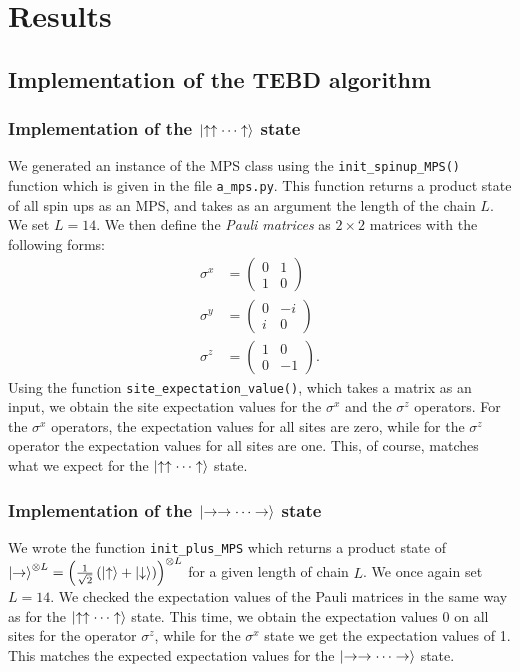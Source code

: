 \section{Results}
\subsection{Implementation of the TEBD algorithm}

\subsubsection{Implementation of the $\ket{\uparrow\uparrow\cdots\uparrow}$ state}
We generated an instance of the MPS class using the \texttt{init\_spinup\_MPS()} function which is given in the file \texttt{a\_mps.py}. This function returns a product state of all spin ups as an MPS, and takes as an argument the length of the chain $L$. We set $L = 14$. We then define the \textit{Pauli matrices} as $2\times 2$ matrices with the following forms:
\begin{align*}
\sigma^x &=
\begin{pmatrix}0&1\\1&0\end{pmatrix}
\\
\sigma^y &=
\begin{pmatrix}0&-i\\i&0\end{pmatrix} 
\\
\sigma^z &=
\begin{pmatrix}1&0\\0&-1\end{pmatrix} .
\end{align*}
Using the function \texttt{site\_expectation\_value()}, which takes a matrix as an input, we obtain the site expectation values for the $\sigma^x$ and the $\sigma^z$ operators. For the $\sigma^x$ operators, the expectation values for all sites are zero, while for the $\sigma^z$ operator the expectation values for all sites are one. This, of course, matches what we expect for the $\ket{\uparrow\uparrow\cdots\uparrow}$ state.

\subsubsection{Implementation of the $\ket{\rightarrow\rightarrow\cdots\rightarrow}$ state}
We wrote the function \texttt{init\_plus\_MPS} which returns a product state of $\ket{\rightarrow}^{\otimes L} = \left( \frac{1}{\sqrt{2}} \left( \ket{\uparrow} + \ket{\downarrow} \right) \right) ^{\otimes L}$ for a given length of chain $L$. We once again set $L = 14$. We checked the expectation values of the Pauli matrices in the same way as for the $\ket{\uparrow\uparrow\cdots\uparrow}$ state. This time, we obtain the expectation values $0$ on all sites for the operator $\sigma^z$, while for the $\sigma^x$ state we get the expectation values of 1. This matches the expected expectation values for the $\ket{\rightarrow\rightarrow\cdots\rightarrow}$ state.

